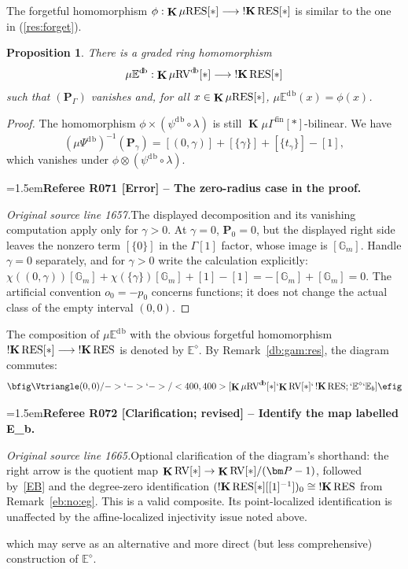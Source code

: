 \documentclass[12pt]{amsart}
\newcommand{\RefereeRemark}[4]{%
  \par\medskip\begingroup\normalfont\small\color{RefereePurple}%
  \emergencystretch=1.5em\noindent\textbf{Referee R#1 [#2] -- #3.}\par\nobreak\noindent #4\par
  \endgroup\medskip
}
\theoremstyle{plain}
\newtheorem{prop}[thm]{Proposition}
\theoremstyle{definition}
\theoremstyle{remark}
\numberwithin{equation}{section}
\theoremstyle{plain}
\newcommand{\RV}{\textup{RV}}
\newcommand{\0}{\emptyset}
\newcommand{\bb}[1]{\mathbb{#1}}
\newcommand{\fun}{\longrightarrow}
\newcommand{\mgRV}{{\mu}{\RV}}
\newcommand{\mG}{{\mu}{\Gamma}}
\newcommand{\RES}{\textup{RES}}
\newcommand{\mgRES}{{\mu}{\RES}}
\newcommand{\mgE}{{\mu}{\bb E}}
\DeclareMathOperator{\ggk}{\mathbf{K}}
\DeclareMathOperator{\sggk}{!\mathbf{K}}
\DeclareMathOperator{\fin}{fin}
\DeclareMathOperator{\db}{d \! b}
\begin{document}
The forgetful homomorphism $\phi : \ggk \mgRES[*] \fun \sggk \RES[*]$ is similar to the one in  (\ref{res:forget}).

\begin{prop}\label{prop:eu:retr:k:db}
There is a graded ring homomorphism
\[
  \mgE^{\db}: \ggk \mgRV^{\db}[*] \fun \sggk \RES[*]
\]
such that $(\bm P_\Gamma)$ vanishes and, for all $x \in \ggk \mgRES[*]$, $\mgE^{\db}(x) = \phi(x)$.
\end{prop}
\begin{proof}
The homomorphism $\phi \times (\psi^{\db} \circ \lambda)$ is still $\ggk \mG^{\fin}[*]$-bilinear. We have
\[
({\mu} \Psi^{\db})^{-1}(\bm P_\gamma) = [(0, \gamma)] + [\{\gamma\}] + [\{t_\gamma\}] - [1],
\]
which vanishes under $\phi \otimes (\psi^{\db} \circ \lambda)$.

\RefereeRemark{071}{Error}{The zero-radius case in the proof}{%
\textit{Original source line 1657.}\quad The displayed decomposition and its vanishing computation apply only for $\gamma>0$. At $\gamma=0$, $\bm P_0=0$, but the displayed right side leaves the nonzero term $[\{0\}]$ in the $\Gamma[1]$ factor, whose image is $[\mathbb G_m]$. Handle $\gamma=0$ separately, and for $\gamma>0$ write the calculation explicitly: $\chi((0,\gamma))[\mathbb G_m]+\chi(\{\gamma\})[\mathbb G_m]+[1]-[1]=-[\mathbb G_m]+[\mathbb G_m]=0$. The artificial convention $o_0=-p_0$ concerns functions; it does not change the actual class of the empty interval $(0,0)$.
}
\end{proof}

The composition of $\mgE^{\db}$ with the obvious forgetful homomorphism $\sggk \RES[*] \fun \sggk \RES$ is denoted by $\bb E^{\diamond}$.  By Remark~\ref{db:gam:res}, the diagram commutes:
\begin{equation}\label{edb:eb:com}
\bfig
 \Vtriangle(0,0)/->`->`->/<400, 400>[{\ggk \mgRV^{\db}[*]}`{\ggk \RV[*]}`\sggk \RES; `\bb E^{\diamond}`\bb E_b]
\efig
\end{equation}

\RefereeRemark{072}{Clarification; revised}{Identify the map labelled E\_b}{%
\textit{Original source line 1665.}\quad Optional clarification of the diagram's shorthand: the right arrow is the quotient map $\ggk\RV[*]\to\ggk\RV[*]/(\bm P-1)$, followed by~\eqref{EB} and the degree-zero identification $(\sggk\RES[*][[1]^{-1}])_0\cong\sggk\RES$ from Remark~\ref{eb:no:eg}. This is a valid composite. Its point-localized identification is unaffected by the affine-localized injectivity issue noted above.
}
which may serve as an alternative and more direct (but less comprehensive) construction of $\bb E^{\diamond}$.
\end{document}
